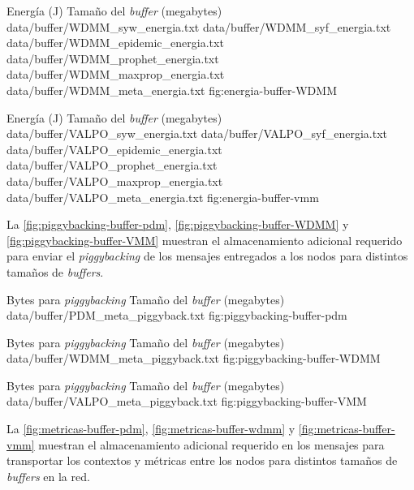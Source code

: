 {
\graficoProtocolos
{Energía (J)}
{Tamaño del \textit{buffer} (megabytes)}
{data/buffer/WDMM_syw_energia.txt}
{data/buffer/WDMM_syf_energia.txt}
{data/buffer/WDMM_epidemic_energia.txt}
{data/buffer/WDMM_prophet_energia.txt}
{data/buffer/WDMM_maxprop_energia.txt}
{data/buffer/WDMM_meta_energia.txt}
}{fig:energia-buffer-WDMM}



{
\graficoProtocolos
{Energía (J)}
{Tamaño del \textit{buffer} (megabytes)}
{data/buffer/VALPO_syw_energia.txt}
{data/buffer/VALPO_syf_energia.txt}
{data/buffer/VALPO_epidemic_energia.txt}
{data/buffer/VALPO_prophet_energia.txt}
{data/buffer/VALPO_maxprop_energia.txt}
{data/buffer/VALPO_meta_energia.txt}
}{fig:energia-buffer-vmm}



La \ref{fig:piggybacking-buffer-pdm},
\ref{fig:piggybacking-buffer-WDMM} y
\ref{fig:piggybacking-buffer-VMM} muestran el almacenamiento adicional
requerido para enviar el \textit{piggybacking} de los mensajes entregados a los
nodos para distintos tamaños de \textit{buffers}.

{
\graficoProtocolo
{Bytes para \textit{piggybacking}}
{Tamaño del \textit{buffer} (megabytes)}
{data/buffer/PDM_meta_piggyback.txt}
}{fig:piggybacking-buffer-pdm}

{
\graficoProtocolo
{Bytes para \textit{piggybacking}}
{Tamaño del \textit{buffer} (megabytes)}
{data/buffer/WDMM_meta_piggyback.txt}
}{fig:piggybacking-buffer-WDMM}


{
\graficoProtocolo
{Bytes para \textit{piggybacking}}
{Tamaño del \textit{buffer} (megabytes)}
{data/buffer/VALPO_meta_piggyback.txt}
}{fig:piggybacking-buffer-VMM}



La \ref{fig:metricas-buffer-pdm}, 
\ref{fig:metricas-buffer-wdmm} y
\ref{fig:metricas-buffer-vmm} muestran el almacenamiento adicional requerido
en los mensajes para transportar los contextos y métricas entre los nodos para
distintos tamaños de \textit{buffers} en la red.

